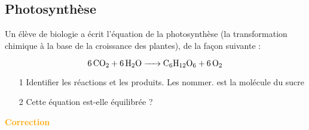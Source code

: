 \documentclass[a4paper,12pt]{article}
\begin{document}
\subsection{Photosynthèse}

Un élève de biologie a écrit l'équation de la photosynthèse (la transformation chimique à la base de la croissance des plantes), de la façon suivante : \par 
\[
\ce{6CO2 + 6H2O -> C6H12O6 + 6O2}
\]
 
\begin{itemize}[noitemsep]
  \item[1] Identifier les réactions et les produits. Les nommer.  est la molécule du sucre
  \item[2] Cette équation est-elle équilibrée ? 
 \end{itemize}

\textcolor{orange}{\textbf{Correction}}
\end{document}
